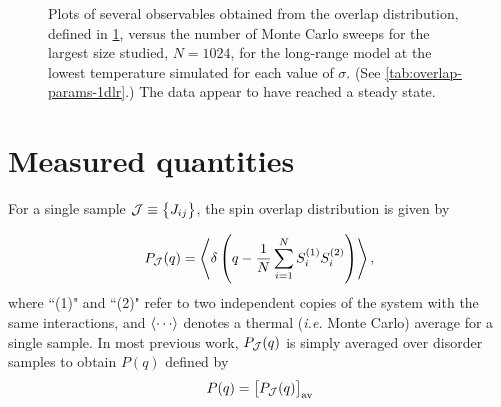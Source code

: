 \begin{figure}
  \centering
  \begin{subfigure}[b]{0.32\textwidth}
    \centering
    
    \label{fig:delta-vs-t-1dlr}
  \end{subfigure}
  \begin{subfigure}[b]{0.32\textwidth}
    \centering
    
    \label{fig:Iav-vs-t-1dlr}
  \end{subfigure}
  \begin{subfigure}[b]{0.32\textwidth}
    \centering
    
    \label{fig:Imed-vs-t-1dlr}
  \end{subfigure}
  \caption[
    Plots of various statistics of the spin overlap distribution as a function
    of Monte Carlo time, indicating that the quantities have reached a steady
    state.
  ]
  {
    Plots of several observables obtained from the overlap distribution,
    defined in \cref{sec:overlap-quantities}, versus the number of Monte Carlo
    sweeps for the largest size studied, $N=1024$, for the long-range model at
    the lowest temperature simulated for each value of $\sigma$. (See
    \cref{tab:overlap-params-1dlr}.) The data appear to have reached a steady
    state.
  }
  \label{fig:overlap-stats-vs-time}
\end{figure}


\section{Measured quantities}
\label{sec:overlap-quantities}

For a single sample $\mathcal{J}\equiv\cbr{J_{ij}}$, the spin overlap
distribution is given by

\begin{equation}
  P_{\mathcal{J}}(q) = \left< \delta\left(q - \frac{1}{N}\sum_{i=1}^N S_i^{(1)} S_i^{(2)}\right) \right>,
  \label{eq:sample-pofq}
\end{equation}
where ``(1)" and ``(2)" refer to two independent copies of the system with the
same interactions, and $\av{\cdots}$ denotes a thermal (\emph{i.e.} Monte
Carlo) average for a single sample. In most previous work, $P_{\mathcal{J}}(q)$
is simply averaged over disorder samples to obtain $P(q)$ defined by
\begin{equation}
  P(q) = \left[P_{\mathcal{J}}(q)\right]_{\mathrm{av}}
  \label{eq:pofq}
\end{equation}


